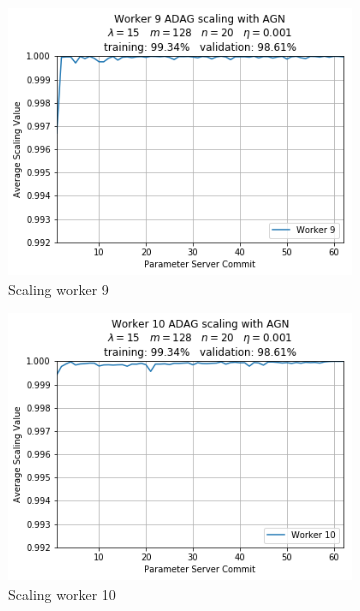 \begin{figure}
\begin{subfigure}{.24\textwidth}
    \includegraphics[width=\linewidth]{resources/images/plots/adag_agn_mnist/epoch_40/15/001/scaling/worker_9}
    \caption{Scaling worker 9}
  \end{subfigure}
  \begin{subfigure}{.24\textwidth}
    \centering
    \includegraphics[width=\linewidth]{resources/images/plots/adag_agn_mnist/epoch_40/15/001/scaling/worker_10}
    \caption{Scaling worker 10}
  \end{subfigure}
  \begin{subfigure}{.24\textwidth}
    \centering

\end{subfigure}
\end{figure}
